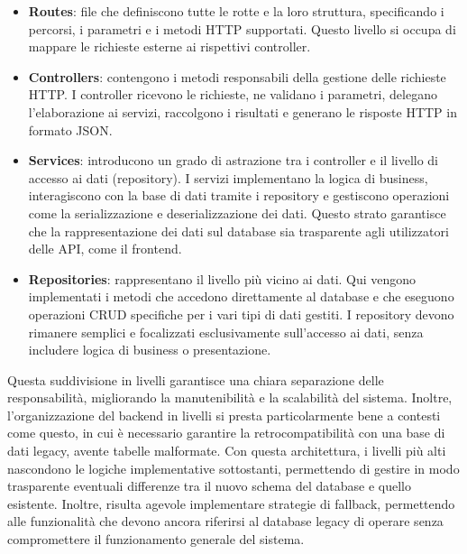 \begin{itemize}
  \item \textbf{Routes}: file che definiscono tutte le rotte e la loro struttura, specificando i percorsi, i parametri e i metodi HTTP supportati. Questo livello si occupa di mappare le richieste esterne ai rispettivi controller.

  \item \textbf{Controllers}: contengono i metodi responsabili della gestione delle richieste HTTP. I controller ricevono le richieste, ne validano i parametri, delegano l'elaborazione ai servizi, raccolgono i risultati e generano le risposte HTTP in formato JSON.

  \item \textbf{Services}: introducono un grado di astrazione tra i controller e il livello di accesso ai dati (repository). I servizi implementano la logica di business, interagiscono con la base di dati tramite i repository e gestiscono operazioni come la serializzazione e deserializzazione dei dati. Questo strato garantisce che la rappresentazione dei dati sul database sia trasparente agli utilizzatori delle API, come il frontend.

  \item \textbf{Repositories}: rappresentano il livello più vicino ai dati. Qui vengono implementati i metodi che accedono direttamente al database e che eseguono operazioni CRUD specifiche per i vari tipi di dati gestiti. I repository devono rimanere semplici e focalizzati esclusivamente sull'accesso ai dati, senza includere logica di business o presentazione.
\end{itemize}

Questa suddivisione in livelli garantisce una chiara separazione delle responsabilità, migliorando la manutenibilità e la scalabilità del sistema. Inoltre, l'organizzazione del backend in livelli si presta particolarmente bene a contesti come questo, in cui è necessario garantire la retrocompatibilità con una base di dati legacy, avente tabelle malformate. Con questa architettura, i livelli più alti nascondono le logiche implementative sottostanti, permettendo di gestire in modo trasparente eventuali differenze tra il nuovo schema del database e quello esistente. Inoltre, risulta agevole implementare strategie di fallback, permettendo alle funzionalità che devono ancora riferirsi al database legacy di operare senza compromettere il funzionamento generale del sistema.
